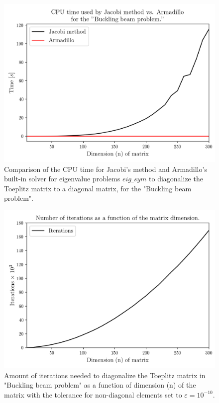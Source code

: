 \documentclass[twoside,onecolumn]{article}
\begin{document}
\begin{figure}[H]

\centerline{\includegraphics[scale= 0.75]{Figure_1_Project_2.png}}
\caption{Comparison of the CPU time for Jacobi's method and Armadillo's\cite{Sanderson2019}\cite{Saddler1971} built-in solver for eigenvalue problems $eig\_sym$ to diagonalize the Toeplitz matrix to a diagonal matrix, for the "Buckling beam problem".}
\label{fig:CPU}
\end{figure}

\begin{figure}[H]
\centerline{\includegraphics[scale= 0.75]{Figure_2_Project_2.png}}
\caption{Amount of iterations needed to diagonalize the Toeplitz matrix in "Buckling beam problem" as a function of dimension (n) of the matrix with the tolerance for non-diagonal elements set to $\varepsilon = 10^{-10}$.}
\label{fig:Iterations}
\end{figure}
\end{document}
